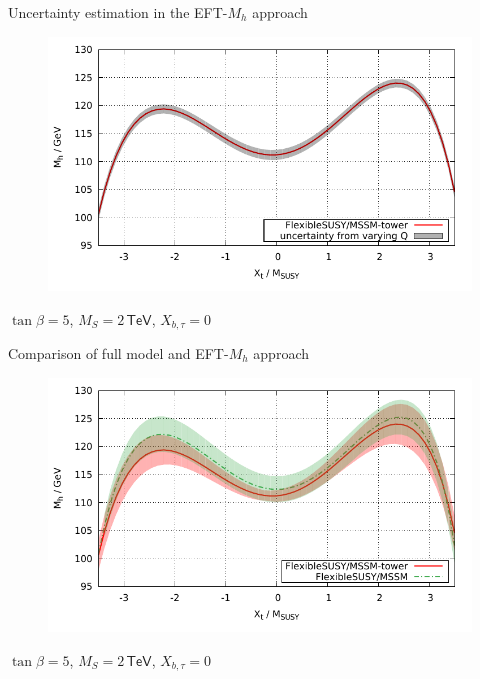 \documentclass[hyperref={pdfpagelabels=false},ngerman]{beamer}
\newcommand{\eh}[1]{\,\mathsf{#1}}
\begin{document}
\begin{frame}{Uncertainty estimation in the EFT-$M_h$ approach}
  \begin{figure}
    \centering
    \includegraphics[width=\textwidth]{plots/xt_MSSM_MS-2000_tower_scale_uncertainty}
  \end{figure}
  $\tan\beta = 5$, $M_S = 2\eh{TeV}$, $X_{b,\tau} = 0$
\end{frame}

\begin{frame}{Comparison of full model and EFT-$M_h$ approach}
  \begin{figure}
    \centering
    \includegraphics[width=\textwidth]{plots/xt_MSSM_MS-2000_uncertainty_tower_and_full}
  \end{figure}
  $\tan\beta = 5$, $M_S = 2\eh{TeV}$, $X_{b,\tau} = 0$
\end{frame}
\end{document}
